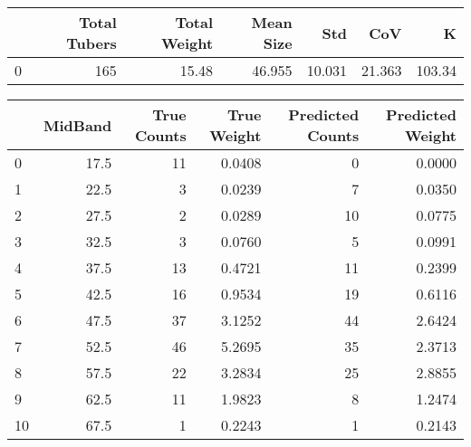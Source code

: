 \begin{tabular}{lrrrrrr}
\toprule
{} &  Total Tubers &  Total Weight &  Mean Size &     Std &     CoV &       K \\
\midrule
0 &           165 &         15.48 &     46.955 &  10.031 &  21.363 &  103.34 \\
\bottomrule
\end{tabular}

\begin{tabular}{lrrrrr}
\toprule
{} &  MidBand &  True Counts &  True Weight &  Predicted Counts &  Predicted Weight \\
\midrule
0  &     17.5 &           11 &       0.0408 &                 0 &            0.0000 \\
1  &     22.5 &            3 &       0.0239 &                 7 &            0.0350 \\
2  &     27.5 &            2 &       0.0289 &                10 &            0.0775 \\
3  &     32.5 &            3 &       0.0760 &                 5 &            0.0991 \\
4  &     37.5 &           13 &       0.4721 &                11 &            0.2399 \\
5  &     42.5 &           16 &       0.9534 &                19 &            0.6116 \\
6  &     47.5 &           37 &       3.1252 &                44 &            2.6424 \\
7  &     52.5 &           46 &       5.2695 &                35 &            2.3713 \\
8  &     57.5 &           22 &       3.2834 &                25 &            2.8855 \\
9  &     62.5 &           11 &       1.9823 &                 8 &            1.2474 \\
10 &     67.5 &            1 &       0.2243 &                 1 &            0.2143 \\
\bottomrule
\end{tabular}
